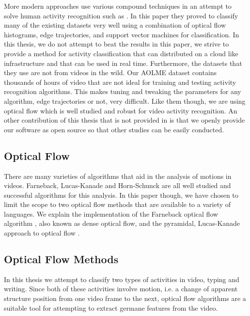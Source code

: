 More modern approaches use various compound techniques in an attempt to solve
human activity recognition such as \cite{wang2016action}. In this paper they
proved to classify many of the existing datasets very well using a combination
of optical flow histograms, edge trajectories, and support vector machines  for
classification. In this thesis, we do not attempt to beat the results in this
paper, we strive to provide a method for activity classification that can
distributed on a cloud like infrastructure and that can be used in real time.
Furthermore, the datasets that they use are not from videos in the wild. Our
AOLME dataset contains thousands of hours of video that are not ideal for
training and testing activity recognition algorithms. This makes tuning and
tweaking the parameters for any algorithm, edge trajectories or not, very
difficult. Like them though, we are using optical flow which is well studied and
robust for video activity recognition. An other contribution of this thesis
that is not provided in \cite{wang2016action} is that we openly provide our software
as open source so that other studies can be easily conducted.



\subsection{\label{section:optical_flow}Optical Flow}
There are many varieties of algorithms that aid in the analysis of motions in
videos.  Farneback, Lucas-Kanade and Horn-Schunck \cite{horn1981determining} are
all well studied and successful algorithms for this analysis. In this paper
though, we have chosen to limit the scope to two optical flow methods that are
available to a variety of languages. We explain the implementation of the
Farneback optical flow algorithm \cite{farneback2003two}, also known as dense
optical flow, and the pyramidal, Lucas-Kanade approach to optical flow
\cite{bouguet2001pyramidal}.

\subsection{\label{section:optical_flow_methods}Optical Flow Methods}
In this thesis we attempt to classify two types of activities in video,  typing
and writing. Since both of these activities involve motion, i.e. a change of
apparent structure position from one video frame to the next, optical flow
algorithms  are a suitable tool for attempting to extract germane features from
the video.

